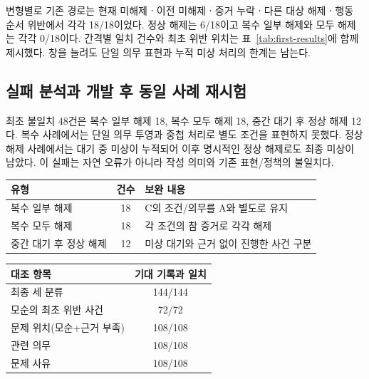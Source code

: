 \begin{revision}
변형별로 기존 경로는 현재 미해제ㆍ이전 미해제ㆍ증거 누락ㆍ다른 대상 해제ㆍ행동 순서 위반에서 각각 18/18이었다. 정상 해제는 6/18이고 복수 일부 해제와 모두 해제는 각각 0/18이다. 간격별 일치 건수와 최초 위반 위치는 표~\ref{tab:first-results}에 함께 제시했다. 창을 늘려도 단일 의무 표현과 누적 미상 처리의 한계는 남는다.

\subsection{실패 분석과 개발 후 동일 사례 재시험}
\label{sec:retest-results}
최초 불일치 48건은 복수 일부 해제 18, 복수 모두 해제 18, 중간 대기 후 정상 해제 12다. 복수 사례에서는 단일 의무 투영과 중첩 처리로 별도 조건을 표현하지 못했다. 정상 해제 사례에서는 대기 중 미상이 누적되어 이후 명시적인 정상 해제로도 최종 미상이 남았다. 이 실패는 자연 오류가 아니라 작성 의미와 기존 표현/정책의 불일치다.

\begin{table}[t]
\centering
\color{revisionblue}
\label{tab:failures}
\scriptsize
\begin{tabularx}{\columnwidth}{L{.36\columnwidth}cY}
\toprule
유형 & 건수 & 보완 내용 \\
\midrule
복수 일부 해제 & 18 & C의 조건/의무를 A와 별도로 유지 \\
복수 모두 해제 & 18 & 각 조건의 참 증거로 각각 해제 \\
중간 대기 후 정상 해제 & 12 & 미상 대기와 근거 없이 진행한 사건 구분 \\
\bottomrule
\end{tabularx}
\end{table}

\begin{table}[t]
\centering
\color{revisionblue}
\label{tab:retest}
\footnotesize
\begin{tabularx}{\columnwidth}{Yc}
\toprule
대조 항목 & 기대 기록과 일치 \\
\midrule
최종 세 분류 & 144/144 \\
모순의 최초 위반 사건 & 72/72 \\
문제 위치(모순+근거 부족) & 108/108 \\
관련 의무 & 108/108 \\
문제 사유 & 108/108 \\
\bottomrule
\end{tabularx}
\end{table}


\end{revision}

